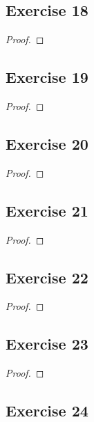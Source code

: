 \documentclass[14pt]{extarticle}
\begin{document}
\subsection{Exercise 18}

\begin{proof}

\end{proof}

\subsection{Exercise 19}

\begin{proof}

\end{proof}

\subsection{Exercise 20}

\begin{proof}

\end{proof}

\subsection{Exercise 21}

\begin{proof}

\end{proof}

\subsection{Exercise 22}

\begin{proof}

\end{proof}

\subsection{Exercise 23}

\begin{proof}

\end{proof}

\subsection{Exercise 24}
\end{document}
